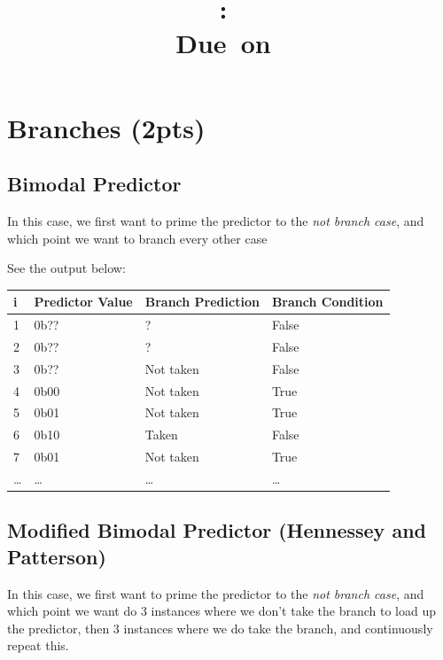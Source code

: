\documentclass{article}
\title{
\vspace{2in}
\textmd{\textbf{\hmwkClass:\ \hmwkTitle}}\\
\normalsize\vspace{0.1in}\small{Due\ on\ \hmwkDueDate}\\
\vspace{0.1in}\large{\textit{\hmwkClassInstructor}}
\vspace{3in}
}
\author{\textbf{\hmwkAuthorName}}
\date{} %
\begin{document}
\maketitle
\newpage




%


\section{Branches (2pts)}
\subsection{Bimodal Predictor}
In this case, we first want to prime the predictor to the \emph{not branch case}, and which point we want to branch every other case


See the output below:\\
\begin{tabular}{| l | l | l | l |}
\hline
  \bf{i} & \bf{Predictor Value} & \bf{Branch Prediction} & \bf{Branch Condition} \\\hline
  1 & 0b?? & ? & False \\\hline
  2 & 0b?? & ? & False \\\hline
  3 & 0b?? & Not taken & False \\\hline
  4 & 0b00 & Not taken & True \\\hline
  5 & 0b01 & Not taken & True \\\hline
  6 & 0b10 & Taken & False \\\hline
  7 & 0b01 & Not taken & True \\\hline
  \dots & \dots & \dots & \dots \\\hline
\end{tabular}
  
\subsection{Modified Bimodal Predictor (Hennessey and Patterson)}
In this case, we first want to prime the predictor to the \emph{not branch case}, and which point we want do 3 instances where we don't take the branch to load up the predictor, then 3 instances where we do take the branch, and continuously repeat this.

\end{document}
